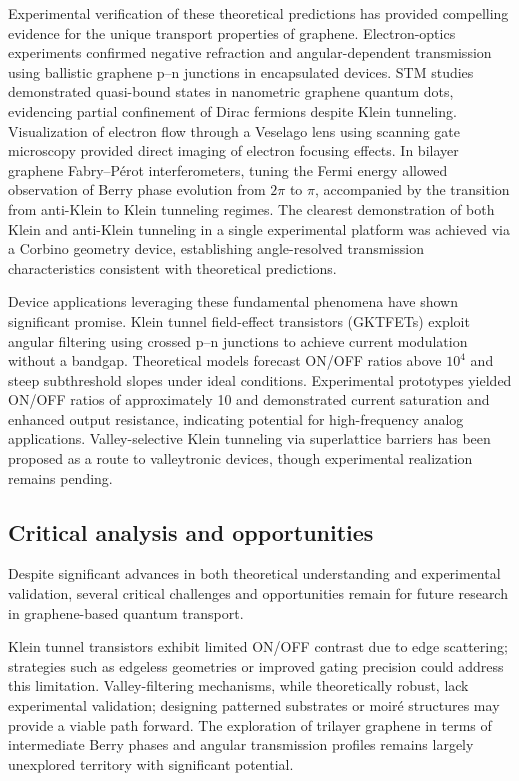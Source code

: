 Experimental verification of these theoretical predictions has provided compelling evidence for the unique transport properties of graphene.
Electron-optics experiments confirmed negative refraction and angular-dependent transmission using ballistic graphene p–n junctions in encapsulated devices\cite{Chen2016}.
STM studies demonstrated quasi-bound states in nanometric graphene quantum dots, evidencing partial confinement of Dirac fermions despite Klein tunneling\cite{Gutierrez2016}.
Visualization of electron flow through a Veselago lens using scanning gate microscopy provided direct imaging of electron focusing effects\cite{Brun2019}.
In bilayer graphene Fabry–Pérot interferometers, tuning the Fermi energy allowed observation of Berry phase evolution from $2\pi$ to $\pi$, accompanied by the transition from anti-Klein to Klein tunneling regimes\cite{Du2018}.
The clearest demonstration of both Klein and anti-Klein tunneling in a single experimental platform was achieved via a Corbino geometry device, establishing angle-resolved transmission characteristics consistent with theoretical predictions\cite{Elahi2024}.

Device applications leveraging these fundamental phenomena have shown significant promise.
Klein tunnel field-effect transistors (GKTFETs) exploit angular filtering using crossed p–n junctions to achieve current modulation without a bandgap\cite{Tan2017}.
Theoretical models forecast ON/OFF ratios above $10^4$ and steep subthreshold slopes under ideal conditions.
Experimental prototypes yielded ON/OFF ratios of approximately 10 and demonstrated current saturation and enhanced output resistance, indicating potential for high-frequency analog applications\cite{Wang2019}.
Valley-selective Klein tunneling via superlattice barriers has been proposed as a route to valleytronic devices, though experimental realization remains pending\cite{An2020}.


\subsection{Critical analysis and opportunities}\label{subsec:future-work}

Despite significant advances in both theoretical understanding and experimental validation, several critical challenges and opportunities remain for future research in graphene-based quantum transport.

Klein tunnel transistors exhibit limited ON/OFF contrast due to edge scattering; strategies such as edgeless geometries or improved gating precision could address this limitation.
Valley-filtering mechanisms, while theoretically robust, lack experimental validation; designing patterned substrates or moiré structures may provide a viable path forward.
The exploration of trilayer graphene in terms of intermediate Berry phases and angular transmission profiles remains largely unexplored territory with significant potential.

